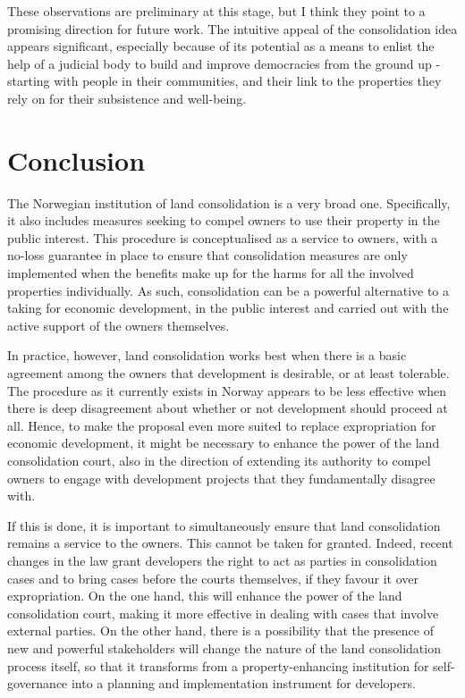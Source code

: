 These observations are preliminary at this stage, but I think they point to a promising direction for future work. The intuitive appeal of the consolidation idea appears significant, especially because of its potential as a means to enlist the help of a judicial body to build and improve democracies from the ground up - starting with people in their communities, and their link to the properties they rely on for their subsistence and well-being.

\section{Conclusion}\label{sec:6:6}

The Norwegian institution of land consolidation is a very broad one. Specifically, it also includes  measures seeking to compel owners to use their property in the public interest. This procedure is conceptualised as a service to owners, with a no-loss guarantee in place to ensure that consolidation measures are only implemented when the benefits make up for the harms for all the involved properties individually. As such, consolidation can be a powerful alternative to a taking for economic development, in the public interest and carried out with the active support of the owners themselves.

In practice, however, land consolidation works best when there is a basic agreement among the owners that development is desirable, or at least tolerable. The procedure as it currently exists in Norway   appears to be less effective when there is deep disagreement about whether or not development should proceed at all. Hence, to make the proposal even more suited to replace expropriation for economic development, it might be necessary to enhance the power of the land consolidation court, also in the direction of extending its authority to compel owners to engage with development projects that they fundamentally disagree with.

If this is done, it is important to simultaneously ensure that land consolidation remains a service to the owners. This cannot be taken for granted. Indeed, recent changes in the law grant developers the right to act as parties in consolidation cases and to bring cases before the courts themselves, if they favour it over expropriation. On the one hand, this will enhance the power of the land consolidation court, making it more effective in dealing with cases that involve external parties. On the other hand, there is a possibility that the presence of new and powerful stakeholders will change the nature of the land consolidation process itself, so that it transforms from a property-enhancing institution for self-governance into a planning and implementation instrument for developers.

